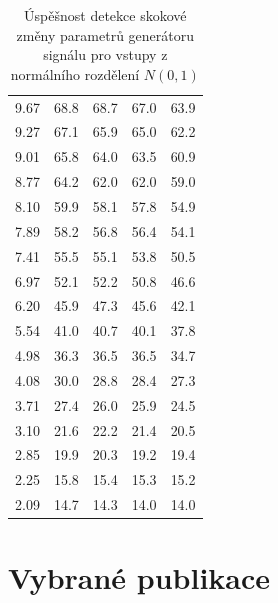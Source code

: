 \documentclass[11pt,twoside,openright]{report}
\begin{document}
\begin{appendices}
\begin{table}[!h]
\begin{center}
\begin{tabular}{|c|c|c|c|c|}
9.67 & 68.8 & 68.7 & 67.0 & 63.9 \\ 
9.27 & 67.1 & 65.9 & 65.0 & 62.2 \\ 
9.01 & 65.8 & 64.0 & 63.5 & 60.9 \\ 
8.77 & 64.2 & 62.0 & 62.0 & 59.0 \\ 
8.10 & 59.9 & 58.1 & 57.8 & 54.9 \\ 
7.89 & 58.2 & 56.8 & 56.4 & 54.1 \\ 
7.41 & 55.5 & 55.1 & 53.8 & 50.5 \\ 
6.97 & 52.1 & 52.2 & 50.8 & 46.6 \\ 
6.20 & 45.9 & 47.3 & 45.6 & 42.1 \\ 
5.54 & 41.0 & 40.7 & 40.1 & 37.8 \\ 
4.98 & 36.3 & 36.5 & 36.5 & 34.7 \\ 
4.08 & 30.0 & 28.8 & 28.4 & 27.3 \\ 
3.71 & 27.4 & 26.0 & 25.9 & 24.5 \\ 
3.10 & 21.6 & 22.2 & 21.4 & 20.5 \\ 
2.85 & 19.9 & 20.3 & 19.2 & 19.4 \\   
2.25 & 15.8 & 15.4 & 15.3 & 15.2 \\ 
2.09 & 14.7 & 14.3 & 14.0 & 14.0 \\ 
\hline
\end{tabular}
\caption{Úspěšnost detekce skokové změny parametrů generátoru signálu pro vstupy z normálního rozdělení $N(0,1)$}
\label{tab:normal}
\end{center}
\end{table}
\clearpage
\section{Vybrané publikace}






\end{appendices}
\end{document}
